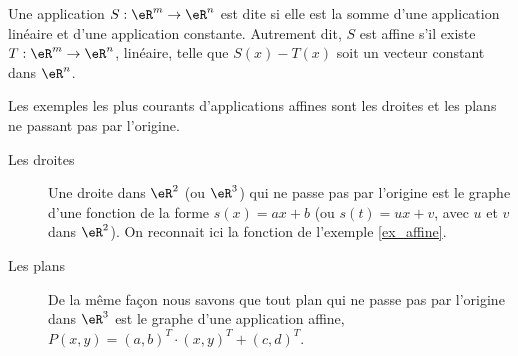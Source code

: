 \begin{definition}
  Une application $S: \eR^m\to\eR^n$ est dite  si elle est la somme d'une application linéaire et d'une application constante. Autrement dit, $S$ est affine s'il existe $T: \eR^m\to\eR^n$, linéaire, telle que $S(x)-T(x)$ soit un vecteur constant dans $\eR^n$. 
\end{definition}

\begin{example}
	Les exemples les plus courants d'applications affines sont les droites et les plans ne passant pas par l'origine.
	\begin{description}
		\item[Les droites] Une droite dans $\eR^2$ (ou $\eR^3$) qui ne passe pas par l'origine est le graphe d'une fonction de la forme $s(x)=ax+b$ (ou $s(t)=u x +v$, avec $u$ et $v$  dans $\eR^2$). On reconnait ici la fonction de l'exemple \ref{ex_affine}.
			
		\item[Les plans]
			De la même façon nous savons que tout plan qui ne passe pas par l'origine dans $\eR^3$ est le graphe d'une application affine, $P(x,y)= (a,b)^T\cdot(x,y)^T+(c,d)^T$.
	\end{description}
\end{example}

